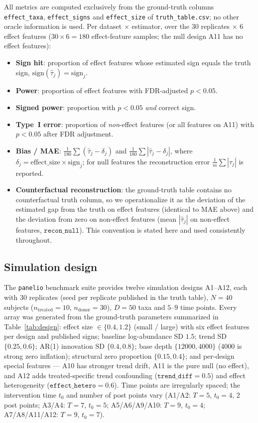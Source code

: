 \documentclass[11pt]{article}
\begin{document}
All metrics are computed exclusively from the ground-truth columns
\texttt{effect\_taxa}, \texttt{effect\_signs} and \texttt{effect\_size} of
\texttt{truth\_table.csv}; no other oracle information is used. Per
dataset $\times$ estimator, over the $30$ replicates $\times$ $6$ effect features
($30\times 6=180$ effect-feature samples; the null design A11 has no effect features):
\begin{itemize}
\item \textbf{Sign hit}: proportion of effect features whose estimated sign equals the truth sign,
$\mathrm{sign}(\hat\tau_j)=\mathrm{sign}_j$.
\item \textbf{Power}: proportion of effect features with FDR-adjusted $p<0.05$.
\item \textbf{Signed power}: proportion with $p<0.05$ \emph{and} correct sign.
\item \textbf{Type~I error}: proportion of \emph{non}-effect features (or all features on A11) with
$p<0.05$ after FDR adjustment.
\item \textbf{Bias / MAE}: $\frac{1}{180}\sum(\hat\tau_j-\delta_j)$ and
$\frac{1}{180}\sum|\hat\tau_j-\delta_j|$, where $\delta_j=\mathrm{effect\_size}\times
\mathrm{sign}_j$; for null features the reconstruction error $\frac{1}{m}\sum|\hat\tau_j|$ is
reported.
\item \textbf{Counterfactual reconstruction}: the ground-truth table contains no counterfactual
truth column, so we operationalize it as the deviation of the estimated gap from the truth on effect
features (identical to MAE above) and the deviation from zero on non-effect features
(mean $|\hat\tau_j|$ on non-effect features, $\texttt{recon\_null}$). This convention is stated here and
used consistently throughout.
\end{itemize}

\subsection{Simulation design} \label{sec:design}

The \texttt{panelio} benchmark suite provides twelve simulation designs A1--A12, each with 30
replicates (seed per replicate published in the truth table), $N=40$ subjects ($n_{\mathrm{treated}}=10$,
$n_{\mathrm{donor}}=30$), $D=50$ taxa and $5$--$9$ time points. Every array was generated from the
ground-truth parameters summarized in Table~\ref{tab:design}: effect size $\in\{0.4,1.2\}$ (small /
large) with six effect features per design and published signs; baseline log-abundance SD $1.5$;
trend SD $\{0.25,0.6\}$; AR(1) innovation SD $\{0.4,0.8\}$; base depth $\{12000,4000\}$ (4000 is
strong zero inflation); structural zero proportion $\{0.15,0.4\}$; and per-design special features
--- A10 has stronger trend drift, A11 is the pure null (no effect), and A12 adds treated-specific
trend confounding ($\texttt{trend\_diff}=0.5$) and effect heterogeneity
($\texttt{effect\_hetero}=0.6$). Time points are irregularly spaced; the intervention time $t_0$ and
number of post points vary (A1/A2: $T=5$, $t_0=4$, 2 post points; A3/A4: $T=7$, $t_0=5$; A5/A6/A9/A10:
$T=9$, $t_0=4$; A7/A8/A11/A12: $T=9$, $t_0=7$).
\end{document}
